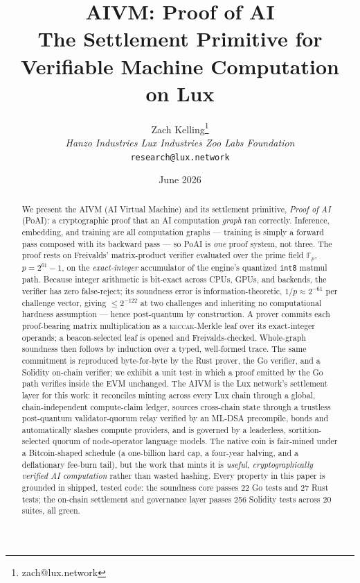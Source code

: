 \documentclass[11pt,a4paper]{article}
\title{AIVM: Proof of AI\\
\large The Settlement Primitive for Verifiable Machine Computation on Lux}
\author{Zach Kelling\thanks{zach@lux.network} \\ \textit{Hanzo Industries \quad Lux Industries \quad Zoo Labs Foundation} \\ \texttt{research@lux.network}}
\date{June 2026}
\begin{document}
\maketitle

\begin{abstract}
We present the AIVM (AI Virtual Machine) and its settlement primitive, \emph{Proof of AI} (PoAI): a cryptographic proof that an AI computation \emph{graph} ran correctly. Inference, embedding, and training are all computation graphs --- training is simply a forward pass composed with its backward pass --- so PoAI is \emph{one} proof system, not three. The proof rests on Freivalds' matrix-product verifier evaluated over the prime field $\mathbb{F}_p$, $p = 2^{61}-1$, on the \emph{exact-integer} accumulator of the engine's quantized \texttt{int8} matmul path. Because integer arithmetic is bit-exact across CPUs, GPUs, and backends, the verifier has zero false-reject; its soundness error is information-theoretic, $1/p \approx 2^{-61}$ per challenge vector, giving $\le 2^{-122}$ at two challenges and inheriting no computational hardness assumption --- hence post-quantum by construction. A prover commits each proof-bearing matrix multiplication as a \textsc{keccak}-Merkle leaf over its exact-integer operands; a beacon-selected leaf is opened and Freivalds-checked. Whole-graph soundness then follows by induction over a typed, well-formed trace. The same commitment is reproduced byte-for-byte by the Rust prover, the Go verifier, and a Solidity on-chain verifier; we exhibit a unit test in which a proof emitted by the Go path verifies inside the EVM unchanged. The AIVM is the Lux network's settlement layer for this work: it reconciles minting across every Lux chain through a global, chain-independent compute-claim ledger, sources cross-chain state through a trustless post-quantum validator-quorum relay verified by an ML-DSA precompile, bonds and automatically slashes compute providers, and is governed by a leaderless, sortition-selected quorum of node-operator language models. The native coin is fair-mined under a Bitcoin-shaped schedule (a one-billion hard cap, a four-year halving, and a deflationary fee-burn tail), but the work that mints it is \emph{useful, cryptographically verified AI computation} rather than wasted hashing. Every property in this paper is grounded in shipped, tested code: the soundness core passes 22 Go tests and 27 Rust tests; the on-chain settlement and governance layer passes 256 Solidity tests across 20 suites, all green.
\end{abstract}
\end{document}
